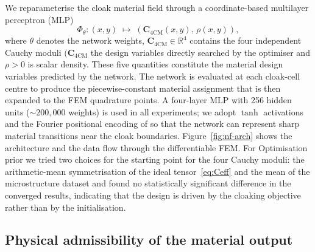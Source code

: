 \documentclass[preprint,12pt]{elsarticle}
\newcommand{\mbf}[1]{\mathbf{#1}}
\newcommand{\be}{\begin{equation}}
\newcommand{\ee}{\end{equation}}
\begin{document}
We reparameterise the cloak material field through a coordinate-based
multilayer perceptron (MLP)
\be\label{eq:neural_field}
  \Phi_\theta\colon(x,y)\;\mapsto\;(\mbf{C}_{\mathrm{4CM}}(x,y),\,\rho(x,y)),
\ee
where $\theta$ denotes the network weights,
$\mbf{C}_{\mathrm{4CM}}\in\mathbb{R}^{4}$ contains the four independent Cauchy
moduli $(\mbf{C}_{\mathrm{4CM}}$  the design variables directly
searched by the optimiser and $\rho > 0$ is scalar density. These five quantities constitute the material design variables predicted by the network. The network
is evaluated at each cloak-cell centre to produce the piecewise-constant
material assignment that is then expanded to the FEM quadrature points.
A four-layer MLP with 256 hidden units ($\sim\!200{,}000$ weights) is
used in all experiments; we adopt $\tanh$ activations and the Fourier
positional encoding of \citet{tancik2020fourier} so that the network
can represent sharp material transitions near the cloak boundaries.
Figure~\ref{fig:nf-arch} shows the architecture and the data flow
through the differentiable FEM. For Optimisation prior we tried two choices for the starting point for the four Cauchy moduli: the 
arithmetic-mean symmetrisation of the ideal tensor~\eqref{eq:Ceff} and the mean of the
microstructure dataset and found no statistically
significant difference in the converged results, indicating that the design
is driven by the cloaking objective rather than by the initialisation.

\subsection{Physical admissibility of the material output}\label{sec:constrained}
\end{document}

